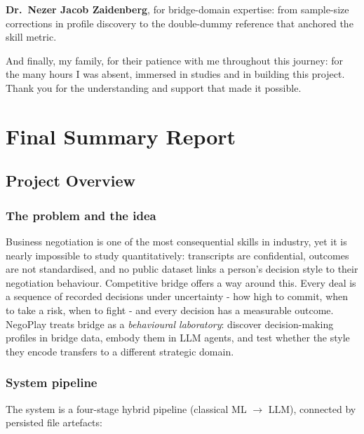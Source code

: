 \documentclass[11pt, a4paper, oneside, openany]{report}
\begin{document}
\vspace{0.3cm}
\textbf{Dr.\ Nezer Jacob Zaidenberg}, for bridge-domain expertise: from
sample-size corrections in profile discovery to the double-dummy reference
that anchored the skill metric.

\vspace{0.3cm}
And finally, my family, for their patience with me throughout this journey:
for the many hours I was absent, immersed in studies and in building this
project. Thank you for the understanding and support that made it possible.

\clearpage
\tableofcontents
\clearpage

\part{Final Summary Report}

\chapter{Project Overview}

\section{The problem and the idea}
Business negotiation is one of the most consequential skills in industry, yet
it is nearly impossible to study quantitatively: transcripts are confidential,
outcomes are not standardised, and no public dataset links a person's
decision style to their negotiation behaviour. Competitive bridge offers a
way around this. Every deal is a sequence of recorded decisions under
uncertainty - how high to commit, when to take a risk, when to fight - 
and every decision has a measurable outcome. NegoPlay treats bridge as a
\emph{behavioural laboratory}: discover decision-making profiles in bridge
data, embody them in LLM agents, and test whether the style they encode
transfers to a different strategic domain.

\section{System pipeline}
The system is a four-stage hybrid pipeline (classical ML $\rightarrow$ LLM),
connected by persisted file artefacts:
\end{document}
